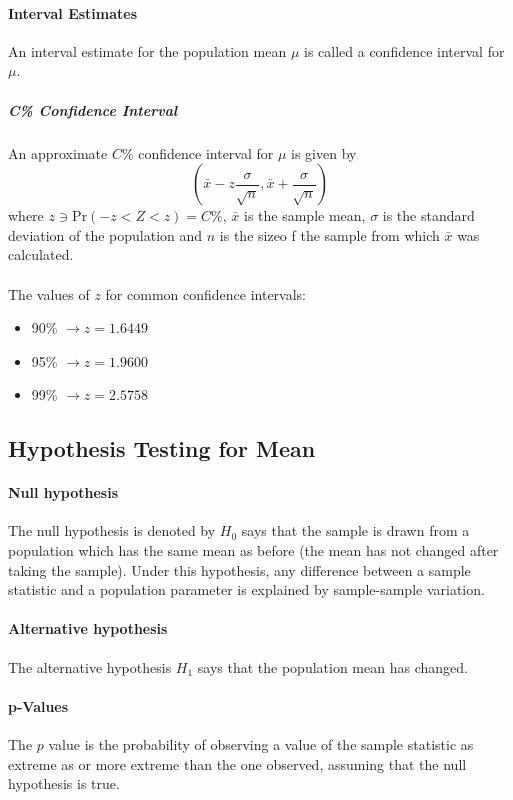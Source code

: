 \documentclass[a4paper,twoside]{article}
\begin{document}
			\paragraph{Interval Estimates} An interval estimate for the population mean $\mu$ is called a confidence interval for $\mu$.
				\subparagraph{C\% Confidence Interval} An approximate $C\%$ confidence interval for $\mu$ is given by
				\[
					\left(\bar{x}-z\frac{\sigma}{\sqrt{n}},\bar{x}+\frac{\sigma}{\sqrt{n}}\right)
				\]
				where $z\ni\mathrm{Pr}(-z<Z<z)=C\%$, $\bar{x}$ is the sample mean, $\sigma$ is the standard deviation of the population and $n$ is the sizeo f the sample from which $\bar{x}$ was calculated.\\\\
				
				The values of $z$ for common confidence intervals:
				\begin{itemize}
					\item 90\% $\to z=1.6449$
					\item 95\% $\to z=1.9600$
					\item 99\% $\to z=2.5758$
				\end{itemize}
		\subsection{Hypothesis Testing for Mean}
			\paragraph{Null hypothesis} The null hypothesis is denoted by $H_0$ says that the sample is drawn from a population which has the same mean as before (the mean has not changed after taking the sample). Under this hypothesis, any difference between a sample statistic and a population parameter is explained by sample-sample variation.
			
			\paragraph{Alternative hypothesis} The alternative hypothesis $H_1$ says that the population mean has changed.
			
			\paragraph{p-Values} The $p$ value is the probability of observing a value of the sample statistic as extreme as or more extreme than the one observed, assuming that the null hypothesis is true.
			
\end{document}
